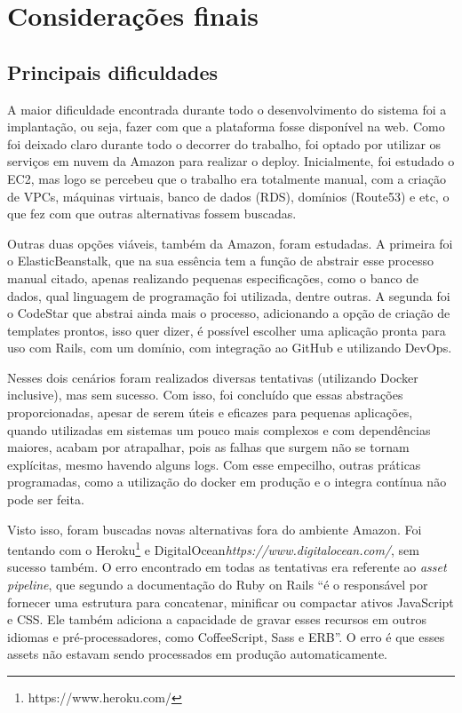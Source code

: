 \chapter{Considerações finais}

\section{Principais dificuldades}

A maior dificuldade encontrada durante todo o desenvolvimento do sistema foi a implantação, ou seja, fazer com que a plataforma fosse disponível na web. Como foi deixado claro durante todo o decorrer do trabalho, foi optado por utilizar os serviços em nuvem da Amazon para realizar o deploy. Inicialmente, foi estudado o EC2, mas logo se percebeu que o trabalho era totalmente manual, com a criação de VPCs, máquinas virtuais, banco de dados (RDS), domínios (Route53) e etc, o que fez com que outras alternativas fossem buscadas. 

Outras duas opções viáveis, também da Amazon, foram estudadas. A primeira foi o ElasticBeanstalk, que na sua essência tem a função de abstrair esse processo manual citado, apenas realizando pequenas especificações, como o banco de dados, qual linguagem de programação foi utilizada, dentre outras. A segunda foi o CodeStar que abstrai ainda mais o processo, adicionando a opção de criação de templates prontos, isso quer dizer, é possível escolher uma aplicação pronta para uso com Rails, com um domínio, com integração ao GitHub e utilizando DevOps.

Nesses dois cenários foram realizados diversas tentativas (utilizando Docker inclusive), mas sem sucesso. Com isso, foi concluído que essas abstrações proporcionadas, apesar de serem úteis e eficazes para pequenas aplicações, quando utilizadas em sistemas um pouco mais complexos e com dependências maiores, acabam por atrapalhar, pois as falhas que surgem não se tornam explícitas, mesmo havendo alguns logs. Com esse empecilho, outras práticas programadas, como a utilização do docker em produção e o integra contínua não pode ser feita.

Visto isso, foram buscadas novas alternativas fora do ambiente Amazon. Foi tentando com o Heroku\footnote{https://www.heroku.com/} e DigitalOcean\textit{https://www.digitalocean.com/}, sem sucesso também. O erro encontrado em todas as tentativas era referente ao \textit{asset pipeline}, que segundo a documentação do Ruby on Rails “é o responsável por fornecer uma estrutura para concatenar, minificar ou compactar ativos JavaScript e CSS. Ele também adiciona a capacidade de gravar esses recursos em outros idiomas e pré-processadores, como CoffeeScript, Sass e ERB”. O erro é que esses assets não estavam sendo processados em produção automaticamente.

